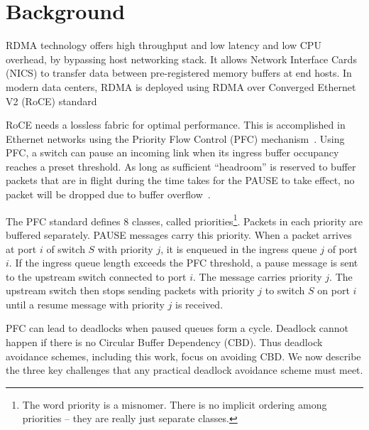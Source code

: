 \section{Background} \label{sec:background}  RDMA
technology offers high throughput and low latency and low CPU overhead, by
bypassing host networking stack. It allows Network Interface Cards (NICS) to
transfer data between pre-registered memory buffers at end hosts.  In modern
data centers, RDMA is deployed using RDMA over Converged Ethernet V2 (RoCE)
standard~\cite{rroce}

 RoCE needs a lossless fabric for optimal performance. This is
accomplished in Ethernet networks using the Priority Flow Control (PFC)
mechanism~\cite{pfc}.  Using PFC, a switch can pause an incoming link when its
ingress buffer occupancy reaches a preset threshold. As long as sufficient
``headroom'' is reserved to buffer packets that are in flight during the time
takes for the PAUSE to take effect, no packet will be dropped due to buffer
overflow~\cite{ciscowhitepaper,dcqcn}.


The PFC standard defines 8 classes, called priorities\footnote{The word priority
is a misnomer. There is no implicit ordering among priorities -- they are really
just separate classes.}. Packets in each priority are buffered separately.
PAUSE messages carry this priority.  When a packet arrives at port $i$ of switch
$S$ with priority $j$, it is enqueued in the ingress queue $j$ of port $i$. If the ingress queue
length exceeds the PFC threshold, a pause message is sent to the upstream
switch connected to port $i$. The message carries priority $j$. The upstream
switch then stops sending packets with priority $j$ to switch $S$ on port $i$
until a resume message with priority $j$ is received.

 PFC can lead to deadlocks when paused queues form a cycle. Deadlock cannot happen if there is no Circular Buffer Dependency (CBD). Thus deadlock avoidance schemes, including this work, focus on
avoiding CBD.  We now describe the three key challenges that any
practical deadlock avoidance scheme must meet.
